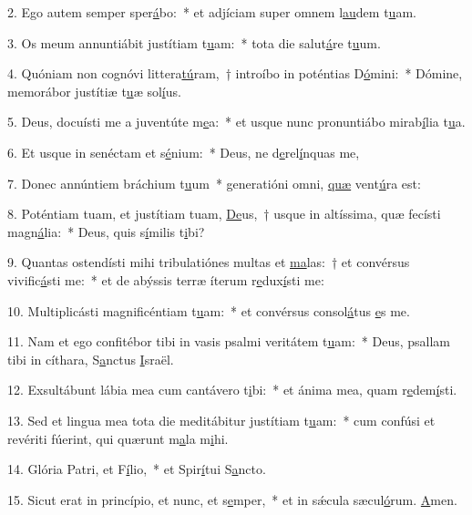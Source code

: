 2. Ego autem semper sper\uline{á}bo:~* et adjíciam super omnem l\uline{au}dem t\uline{u}am.\par 
3. Os meum annuntiábit justítiam t\uline{u}am:~* tota die salut\uline{á}re t\uline{u}um.\par 
4. Quóniam non cognóvi littera\uline{tú}ram,~† introíbo in poténtias D\uline{ó}mini:~* Dómine, memorábor justítiæ t\uline{u}æ sol\uline{í}us.\par 
5. Deus, docuísti me a juventúte m\uline{e}a:~* et usque nunc pronuntiábo mirab\uline{í}lia t\uline{u}a.\par 
6. Et usque in senéctam et s\uline{é}nium:~* Deus, ne d\uline{e}rel\uline{í}nquas me,\par 
7. Donec annúntiem bráchium t\uline{u}um~* generatióni omni, \uline{quæ} vent\uline{ú}ra est:\par 
8. Poténtiam tuam, et justítiam tuam, \uline{De}us,~† usque in altíssima, quæ fecísti magn\uline{á}lia:~* Deus, quis s\uline{í}milis t\uline{i}bi?\par 
9. Quantas ostendísti mihi tribulatiónes multas et \uline{ma}las:~† et convérsus vivific\uline{á}sti me:~* et de abýssis terræ íterum r\uline{e}dux\uline{í}sti me:\par 
10. Multiplicásti magnificéntiam t\uline{u}am:~* et convérsus consol\uline{á}tus \uline{e}s me.\par 
11. Nam et ego confitébor tibi in vasis psalmi veritátem t\uline{u}am:~* Deus, psallam tibi in cíthara, S\uline{a}nctus \uline{I}sraël.\par 
12. Exsultábunt lábia mea cum cantávero t\uline{i}bi:~* et ánima mea, quam r\uline{e}dem\uline{í}sti.\par 
13. Sed et lingua mea tota die meditábitur justítiam t\uline{u}am:~* cum confúsi et revériti fúerint, qui quærunt m\uline{a}la m\uline{i}hi.\par 
14. Glória Patri, et F\uline{í}lio,~* et Spir\uline{í}tui S\uline{a}ncto.\par 
15. Sicut erat in princípio, et nunc, et s\uline{e}mper,~* et in sǽcula sæcul\uline{ó}rum. \uline{A}men.\par 
